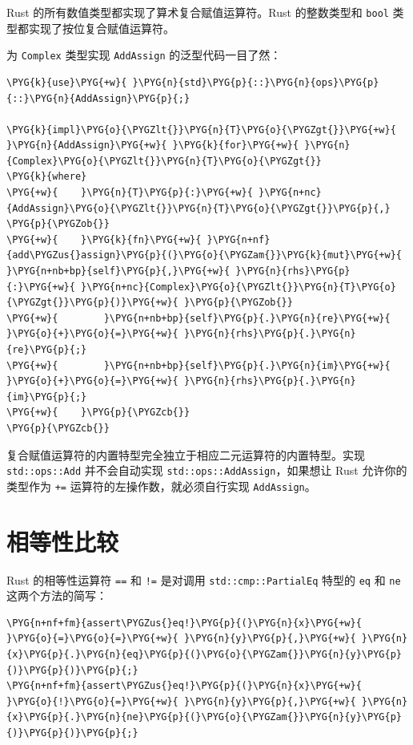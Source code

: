 Rust 的所有数值类型都实现了算术复合赋值运算符。Rust 的整数类型和 \texttt{bool} 类型都实现了按位复合赋值运算符。

为 \texttt{Complex} 类型实现 \texttt{AddAssign} 的泛型代码一目了然：

\begin{Verbatim}[commandchars=\\\{\},breaklines=true,breakanywhere=true,fontsize=\codefont,xleftmargin=17bp]
\PYG{k}{use}\PYG{+w}{ }\PYG{n}{std}\PYG{p}{::}\PYG{n}{ops}\PYG{p}{::}\PYG{n}{AddAssign}\PYG{p}{;}

\PYG{k}{impl}\PYG{o}{\PYGZlt{}}\PYG{n}{T}\PYG{o}{\PYGZgt{}}\PYG{+w}{ }\PYG{n}{AddAssign}\PYG{+w}{ }\PYG{k}{for}\PYG{+w}{ }\PYG{n}{Complex}\PYG{o}{\PYGZlt{}}\PYG{n}{T}\PYG{o}{\PYGZgt{}}
\PYG{k}{where}
\PYG{+w}{    }\PYG{n}{T}\PYG{p}{:}\PYG{+w}{ }\PYG{n+nc}{AddAssign}\PYG{o}{\PYGZlt{}}\PYG{n}{T}\PYG{o}{\PYGZgt{}}\PYG{p}{,}
\PYG{p}{\PYGZob{}}
\PYG{+w}{    }\PYG{k}{fn}\PYG{+w}{ }\PYG{n+nf}{add\PYGZus{}assign}\PYG{p}{(}\PYG{o}{\PYGZam{}}\PYG{k}{mut}\PYG{+w}{ }\PYG{n+nb+bp}{self}\PYG{p}{,}\PYG{+w}{ }\PYG{n}{rhs}\PYG{p}{:}\PYG{+w}{ }\PYG{n+nc}{Complex}\PYG{o}{\PYGZlt{}}\PYG{n}{T}\PYG{o}{\PYGZgt{}}\PYG{p}{)}\PYG{+w}{ }\PYG{p}{\PYGZob{}}
\PYG{+w}{        }\PYG{n+nb+bp}{self}\PYG{p}{.}\PYG{n}{re}\PYG{+w}{ }\PYG{o}{+}\PYG{o}{=}\PYG{+w}{ }\PYG{n}{rhs}\PYG{p}{.}\PYG{n}{re}\PYG{p}{;}
\PYG{+w}{        }\PYG{n+nb+bp}{self}\PYG{p}{.}\PYG{n}{im}\PYG{+w}{ }\PYG{o}{+}\PYG{o}{=}\PYG{+w}{ }\PYG{n}{rhs}\PYG{p}{.}\PYG{n}{im}\PYG{p}{;}
\PYG{+w}{    }\PYG{p}{\PYGZcb{}}
\PYG{p}{\PYGZcb{}}
\end{Verbatim}

复合赋值运算符的内置特型完全独立于相应二元运算符的内置特型。实现 \texttt{std::ops::Add} 并不会自动实现 \texttt{std::ops::AddAssign}，如果想让 Rust 允许你的类型作为 \texttt{+=} 运算符的左操作数，就必须自行实现 \texttt{AddAssign}。

\section{相等性比较}

Rust 的相等性运算符 \texttt{==} 和 \texttt{!=} 是对调用 \texttt{std::cmp::PartialEq} 特型的 \texttt{eq} 和 \texttt{ne} 这两个方法的简写：

\begin{Verbatim}[commandchars=\\\{\},breaklines=true,breakanywhere=true,fontsize=\codefont,xleftmargin=17bp]
\PYG{n+nf+fm}{assert\PYGZus{}eq!}\PYG{p}{(}\PYG{n}{x}\PYG{+w}{ }\PYG{o}{=}\PYG{o}{=}\PYG{+w}{ }\PYG{n}{y}\PYG{p}{,}\PYG{+w}{ }\PYG{n}{x}\PYG{p}{.}\PYG{n}{eq}\PYG{p}{(}\PYG{o}{\PYGZam{}}\PYG{n}{y}\PYG{p}{)}\PYG{p}{)}\PYG{p}{;}
\PYG{n+nf+fm}{assert\PYGZus{}eq!}\PYG{p}{(}\PYG{n}{x}\PYG{+w}{ }\PYG{o}{!}\PYG{o}{=}\PYG{+w}{ }\PYG{n}{y}\PYG{p}{,}\PYG{+w}{ }\PYG{n}{x}\PYG{p}{.}\PYG{n}{ne}\PYG{p}{(}\PYG{o}{\PYGZam{}}\PYG{n}{y}\PYG{p}{)}\PYG{p}{)}\PYG{p}{;}
\end{Verbatim}

